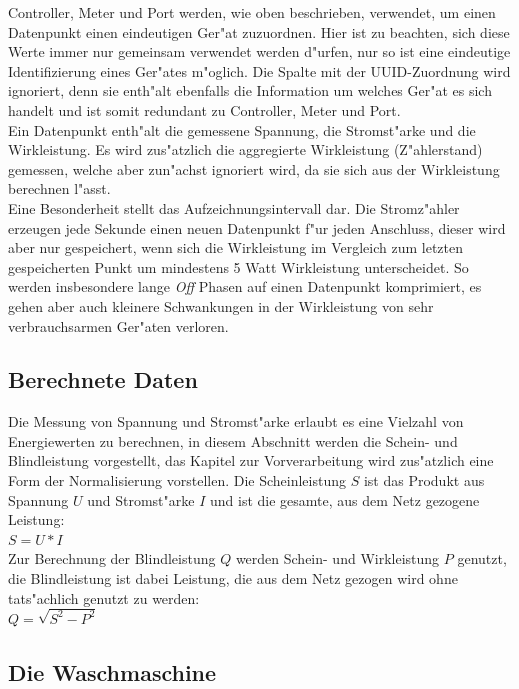 Controller, Meter und Port werden, wie oben beschrieben, verwendet, um einen Datenpunkt einen eindeutigen Ger"at zuzuordnen. Hier ist zu beachten, sich diese Werte immer nur gemeinsam verwendet werden d"urfen, nur so ist eine eindeutige Identifizierung eines Ger"ates m"oglich.
Die Spalte mit der UUID-Zuordnung wird ignoriert, denn sie enth"alt ebenfalls die Information um welches Ger"at es sich handelt und ist somit redundant zu Controller, Meter und Port. \\
Ein Datenpunkt enth"alt die gemessene Spannung, die Stromst"arke und die Wirkleistung. Es wird zus"atzlich die aggregierte Wirkleistung (Z"ahlerstand) gemessen, welche aber zun"achst ignoriert wird, da sie sich aus der Wirkleistung berechnen l"asst. \\
Eine Besonderheit stellt das Aufzeichnungsintervall dar. Die Stromz"ahler erzeugen jede Sekunde einen neuen Datenpunkt f"ur jeden Anschluss, dieser wird aber nur gespeichert, wenn sich die Wirkleistung im Vergleich zum letzten gespeicherten Punkt um mindestens 5 Watt Wirkleistung unterscheidet. So werden insbesondere lange \textit{Off} Phasen auf einen Datenpunkt komprimiert, es gehen aber auch kleinere Schwankungen in der Wirkleistung von sehr verbrauchsarmen Ger"aten verloren.


\subsection{Berechnete Daten}
\label{Berechnete Daten}

Die Messung von Spannung und Stromst"arke erlaubt es eine Vielzahl von Energiewerten zu berechnen, in diesem Abschnitt werden die Schein- und Blindleistung vorgestellt, das Kapitel zur Vorverarbeitung wird zus"atzlich eine Form der Normalisierung vorstellen. 
Die Scheinleistung $S$ ist das Produkt aus Spannung $U$ und Stromst"arke $I$ und ist die gesamte, aus dem Netz gezogene Leistung:\\ $S = U * I$\\[0.5cm]
Zur Berechnung der Blindleistung $Q$ werden Schein- und Wirkleistung $P$ genutzt, die Blindleistung ist dabei Leistung, die aus dem Netz gezogen wird ohne tats"achlich genutzt zu werden:\\ $Q = \sqrt{S^2 - P^2}$ \\


\subsection{Die Waschmaschine}
\label{Die Waschmaschine}

